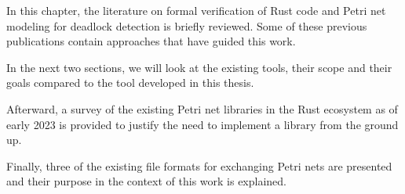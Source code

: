 In this chapter, the literature on formal verification of Rust code
and Petri net modeling for deadlock detection is briefly reviewed.
Some of these previous publications contain approaches
that have guided this work.

In the next two sections, we will look at the existing tools,
their scope and their goals compared to the tool developed in this thesis.

Afterward, a survey of the existing Petri net libraries in the Rust ecosystem
as of early 2023 is provided to justify the need to implement a library
from the ground up.

Finally, three of the existing file formats for exchanging Petri nets are presented
and their purpose in the context of this work is explained.